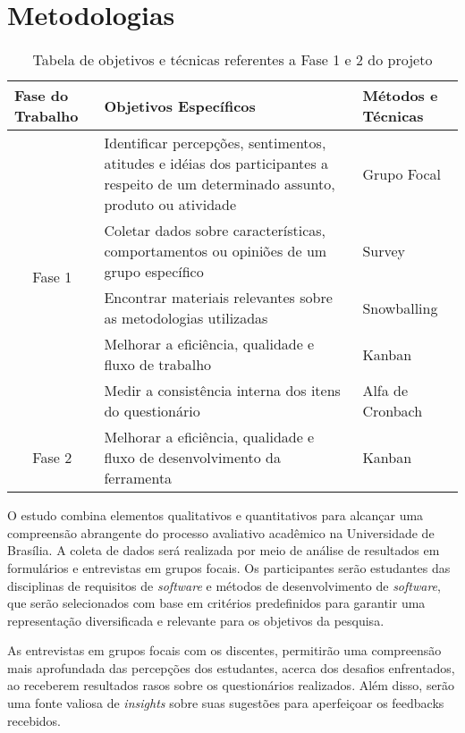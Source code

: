 \section{Metodologias}

\begin{table}[!ht]
    \centering
    \begin{tabularx}{\textwidth}{|X|X|X|}
    \hline
        Fase do Trabalho & Objetivos Específicos & Métodos e Técnicas \\ \hline
        \multicolumn{1}{c|}{\multirow{5}{*}{Fase 1}} & Identificar percepções, sentimentos, atitudes
        e idéias dos participantes a respeito de um determinado assunto, produto ou atividade & Grupo Focal \\ \cline{2-3}
        & Coletar dados sobre características, comportamentos ou opiniões de um grupo específico & Survey \\ \cline{2-3}
        & Encontrar materiais relevantes sobre as metodologias utilizadas & Snowballing \\ \cline{2-3}
        & Melhorar a eficiência, qualidade e fluxo de trabalho & Kanban \\ \cline{2-3}
        & Medir a consistência interna dos itens do questionário & Alfa de Cronbach \\ \hline
        \multicolumn{1}{c|}{\multirow{1}{*}{Fase 2}} & Melhorar a eficiência, qualidade e fluxo de desenvolvimento da ferramenta & Kanban \\ \hline
    \end{tabularx}
    \caption{Tabela de objetivos e técnicas referentes a Fase 1 e 2 do projeto}
\end{table}

O estudo combina elementos qualitativos e quantitativos para alcançar uma compreensão abrangente do processo avaliativo acadêmico na Universidade de Brasília. A coleta de dados será realizada por meio de análise de resultados em formulários e entrevistas em grupos focais. Os participantes serão estudantes das disciplinas de requisitos de \textit{software} e métodos de desenvolvimento de \textit{software}, que serão selecionados com base em critérios predefinidos para garantir uma representação diversificada e relevante para os objetivos da pesquisa.

As entrevistas em grupos focais com os discentes, permitirão uma compreensão mais aprofundada das percepções dos estudantes, acerca dos desafios enfrentados, ao receberem resultados rasos sobre os questionários realizados. Além disso, serão uma fonte valiosa de \textit{insights} sobre suas sugestões para aperfeiçoar os feedbacks recebidos.

